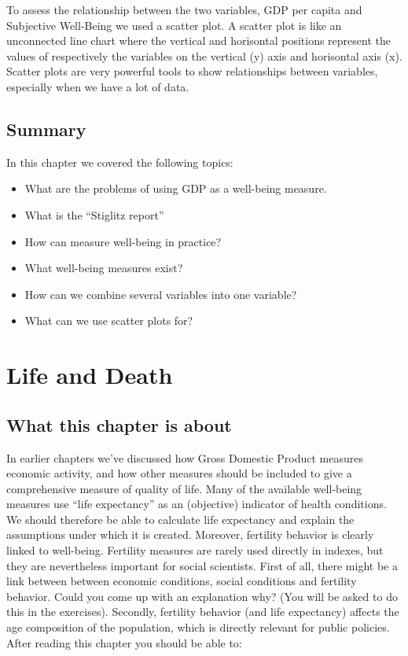 \documentclass[]{book}
\providecommand{\tightlist}{%
  \setlength{\itemsep}{0pt}\setlength{\parskip}{0pt}}
\begin{document}
To assess the relationship between the two variables, GDP per capita and Subjective Well-Being we used a scatter plot. A scatter plot is like an unconnected line chart where the vertical and horisontal positions represent the values of respectively the variables on the vertical (y) axis and horisontal axis (x). Scatter plots are very powerful tools to show relationships between variables, especially when we have a lot of data.

\hypertarget{summary-1}{%
\section{Summary}\label{summary-1}}

In this chapter we covered the following topics:

\begin{itemize}
\tightlist
\item
  What are the problems of using GDP as a well-being measure.
\item
  What is the ``Stiglitz report''
\item
  How can measure well-being in practice?
\item
  What well-being measures exist?
\item
  How can we combine several variables into one variable?
\item
  What can we use scatter plots for?
\end{itemize}

\hypertarget{life-and-death}{%
\chapter{Life and Death}\label{life-and-death}}

\hypertarget{what-this-chapter-is-about}{%
\section{What this chapter is about}\label{what-this-chapter-is-about}}

In earlier chapters we've discussed how Gross Domestic Product measures economic activity, and how other measures should be included to give a comprehensive measure of quality of life. Many of the available well-being measures use ``life expectancy'' as an (objective) indicator of health conditions. We should therefore be able to calculate life expectancy and explain the assumptions under which it is created. Moreover, fertility behavior is clearly linked to well-being. Fertility measures are rarely used directly in indexes, but they are nevertheless important for social scientists. First of all, there might be a link between between economic conditions, social conditions and fertility behavior. Could you come up with an explanation why? (You will be asked to do this in the exercises). Secondly, fertility behavior (and life expectancy) affects the age composition of the population, which is directly relevant for public policies. After reading this chapter you should be able to:
\end{document}
